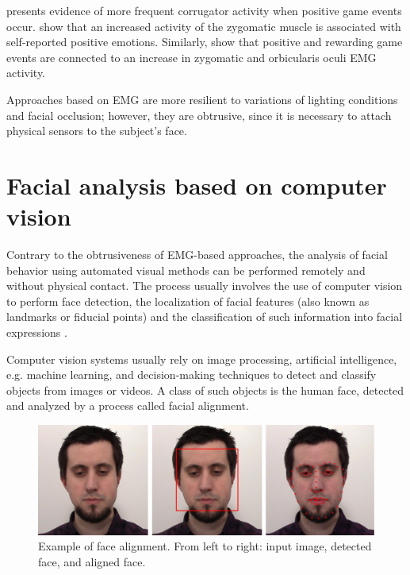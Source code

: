 \textcite{hazlett2006measuring} presents evidence of more frequent corrugator activity when positive game events occur. \textcite{tijs2008dynamic} show that an increased activity of the zygomatic muscle is associated with self-reported positive emotions. Similarly, \textcite{ravaja20051} show that positive and rewarding game events are connected to an increase in zygomatic and orbicularis oculi EMG activity.

Approaches based on EMG are more resilient to variations of lighting conditions and facial occlusion; however, they are obtrusive, since it is necessary to attach physical sensors to the subject's face.

\section{Facial analysis based on computer vision}

Contrary to the obtrusiveness of EMG-based approaches, the analysis of facial behavior using automated visual methods can be performed remotely and without physical contact. The process usually involves the use of computer vision to perform face detection, the localization of facial features (also known as landmarks or fiducial points) and the classification of such information into facial expressions \parencite{salah2010communication}.

Computer vision systems usually rely on image processing, artificial intelligence, e.g. machine learning, and decision-making techniques to detect and classify objects from images or videos. A class of such objects is the human face, detected and analyzed by a process called facial alignment.

\begin{figure}[h]
    \centering
    \includegraphics[width=\linewidth]{Content/figures/face-alignment.jpg}
    \caption{Example of face alignment. From left to right: input image, detected face, and aligned face.}
    \label{fig:alignment}
\end{figure}

